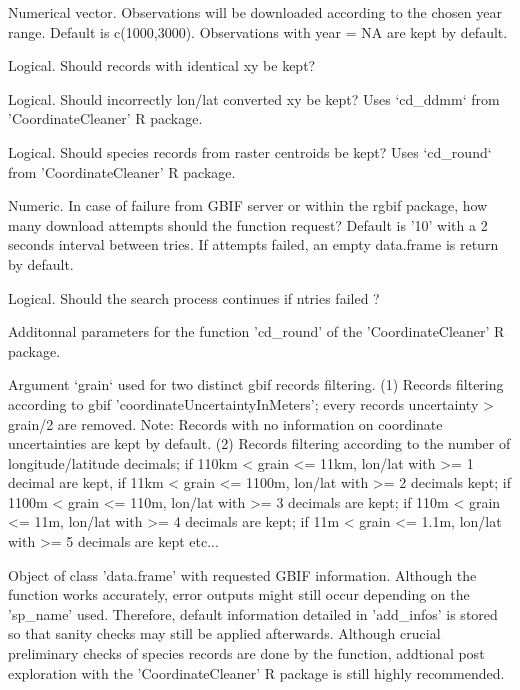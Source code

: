 \documentclass[a4paper]{book}
\begin{document}
\begin{Arguments}
\begin{ldescription}
\item[\code{time\_period}] Numerical vector. Observations will be downloaded according to the chosen
year range. Default is c(1000,3000). Observations with year = NA are kept by default.

\item[\code{identic\_xy}] Logical. Should records with identical xy be kept?

\item[\code{wConverted\_xy}] Logical. Should incorrectly lon/lat converted xy be kept?
Uses `cd\_ddmm` from 'CoordinateCleaner' R package.

\item[\code{centroids}] Logical. Should species records from raster centroids be kept?
Uses `cd\_round` from 'CoordinateCleaner' R package.

\item[\code{ntries}] Numeric. In case of failure from GBIF server or within the rgbif package, how many
download attempts should the function request? Default is '10' with a 2 seconds interval
between tries. If attempts failed, an empty data.frame is return by default.

\item[\code{error.skip}] Logical. Should the search process continues if ntries failed ?

\item[\code{...}] Additonnal parameters for the function 'cd\_round' of the 'CoordinateCleaner'
R package.
\end{ldescription}
\end{Arguments}
%
\begin{Details}\relax
Argument `grain` used for two distinct gbif records filtering. (1) Records filtering
according to gbif 'coordinateUncertaintyInMeters'; every records uncertainty > grain/2
are removed. Note: Records with no information on coordinate uncertainties are kept by
default. (2) Records filtering according to the number of longitude/latitude decimals;
if 110km < grain <= 11km, lon/lat with >= 1 decimal are kept, if 11km < grain <= 1100m,
lon/lat with >= 2 decimals kept; if 1100m < grain <= 110m, lon/lat with >= 3 decimals
are kept; if 110m < grain <= 11m, lon/lat with >= 4 decimals are kept;
if 11m < grain <= 1.1m, lon/lat with >= 5 decimals are kept etc...
\end{Details}
%
\begin{Value}
Object of class 'data.frame' with requested GBIF information. Although the function
works accurately, error outputs might still occur depending on the 'sp\_name' used.
Therefore, default information detailed in 'add\_infos' is stored so that sanity checks
may still be applied afterwards. Although crucial preliminary checks of species records
are done by the function, addtional post exploration with the 'CoordinateCleaner' R
package is still highly recommended.
\end{Value}
\end{document}
